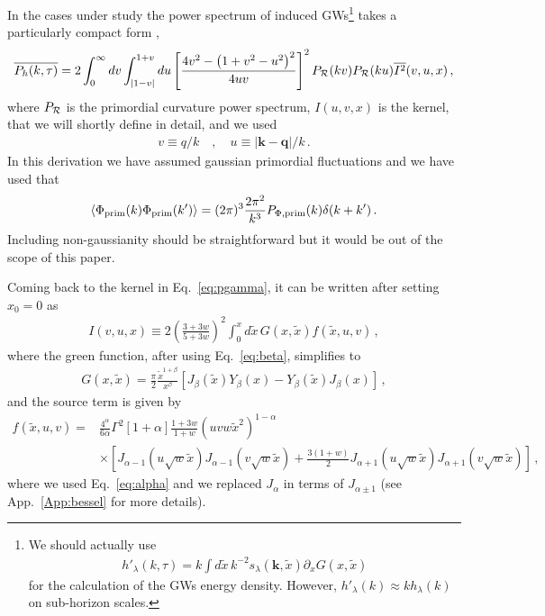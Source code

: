 \documentclass[aps,10pt,prd,groupedaddress,nofootinbib,notitlepage,eqsecnum,preprintnumbers]{revtex4-1}
\begin{document}
In the cases under study the power spectrum of induced GWs\footnote{We should actually use 
\begin{align}
h'_\lambda(k,\tau)=k\int d\tilde x \,k^{-2}s_\lambda(\mathbf{k},\tilde x)\partial_x G(x,\tilde x)\nonumber
\end{align}
for the calculation of the GWs energy density. However, $h'_\lambda(k)\approx k h_\lambda(k)$ on sub-horizon scales.} takes a particularly compact form \cite{Kohri:2018awv},
\begin{align}\label{eq:pgamma}
\overline{P_h(k,\tau)}=2\int_0^\infty dv \int_{|1-v|}^{1+v} du\left[\frac{4v^2-\left(1+v^2-u^2\right)^2}{4uv}\right]^2 P_{\cal R}(kv)P_{\cal R}(ku)\overline{I^2}(v,u,x)\,,
\end{align}
where $P_{\cal R}$ is the primordial curvature power spectrum, $I(u,v,x)$ is the kernel, that we will shortly define in detail, and we used
\begin{align}
v\equiv q/k\quad,\quad u\equiv|\mathbf{k}-\mathbf{q}|/k\,.
\end{align}
In this derivation we have assumed gaussian primordial fluctuations and we have used that
\begin{align}
\langle \Phi_{\rm prim}(k)\Phi_{\rm prim}(k')\rangle=(2\pi)^3\frac{2\pi^2}{k^3}P_{\Phi,{\rm prim}}(k)\delta(k+k')\,.
\end{align}
Including non-gaussianity should be straightforward but it would be out of the scope of this paper.

Coming back to the kernel in Eq.~\eqref{eq:pgamma}, it can be written after setting $x_0=0$ as
\begin{align}\label{eq:kernel}
I(v,u,x)\equiv 2\left(\frac{3+3w}{5+3w}\right)^2\int_{0}^x d\tilde x \,G(x,\tilde x) f(\tilde x, u, v)\,,
\end{align}
where the green function, after using Eq.~\eqref{eq:beta}, simplifies to
\begin{align}\label{eq:green2}
G(x,\tilde x)=\frac{\pi}{2}\frac{\tilde x^{1+\beta}}{x^{\beta}}\left[J_\beta(\tilde x)Y_\beta(x)-Y_\beta(\tilde x) J_\beta(x)\right]\,,
\end{align}
and the source term is given by
\begin{align}\label{eq:source}
f(\tilde x, u, v)=&\frac{4^\alpha}{6\alpha}\Gamma^2[1+\alpha]\frac{1+3w}{1+w}\left(uvw\tilde x^2\right)^{1-\alpha}\nonumber\\&
\times\left[J_{\alpha-1}(u\sqrt{w}\tilde x)J_{\alpha-1}(v\sqrt{w}\tilde x)+\frac{3(1+w)}{2}J_{\alpha+1}(u\sqrt{w}\tilde x)J_{\alpha+1}(v\sqrt{w}\tilde x)\right]\,,
\end{align}
where we used Eq.~\eqref{eq:alpha} and we replaced $J_\alpha$ in terms of $J_{\alpha\pm1}$ (see App.~\ref{App:bessel} for more details). 
\end{document}
